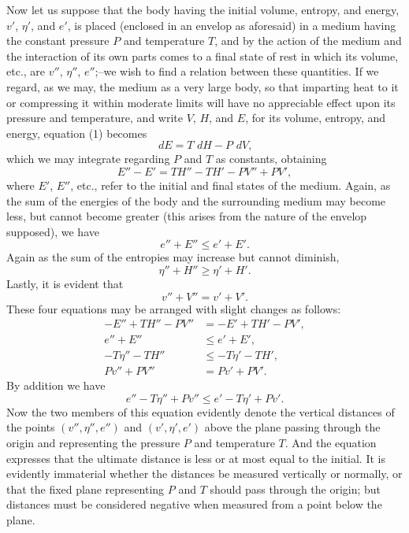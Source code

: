 \documentclass[11pt]{article}
\newcommand{\dd}{\,d}
\begin{document}
Now let us suppose that the body having the initial volume, entropy, and energy, $v'$, $\eta'$, and $e'$, is placed (enclosed in an envelop as aforesaid) in a medium having the constant pressure $P$ and temperature $T$, and by the action of the medium and the interaction of its own parts comes to a final state of rest in which its volume, etc., are $v''$, $\eta''$, $e''$;--we wish to find a relation between these quantities. If we regard, as we may, the medium as a very large body, so that imparting heat to it or compressing it within moderate limits will have no appreciable effect upon its pressure and temperature, and write $V$, $H$, and $E$, for its volume, entropy, and energy, equation (1) becomes
\[
\dd E=T\,\dd H-P\,\dd V,
\]
which we may integrate regarding $P$ and $T$ as constants, obtaining
\begin{equation}
E''-E'=TH''-TH'-PV''+PV', \tag{a}
\end{equation}
where $E'$, $E''$, etc., refer to the initial and final states of the medium. Again, as the sum of the energies of the body and the surrounding medium may become less, but cannot become greater (this arises from the nature of the envelop supposed), we have
\begin{equation}
e''+E''\le e'+E'. \tag{b}
\end{equation}
Again as the sum of the entropies may increase but cannot diminish,
\begin{equation}
\eta''+H''\ge \eta'+H'. \tag{c}
\end{equation}
Lastly, it is evident that
\begin{equation}
v''+V''=v'+V'. \tag{d}
\end{equation}
These four equations may be arranged with slight changes as follows:
\begin{align*}
-E''+TH''-PV''&=-E'+TH'-PV',\\
e''+E''&\le e'+E',\\
-T\eta''-TH''&\le -T\eta'-TH',\\
Pv''+PV''&=Pv'+PV'.
\end{align*}
By addition we have
\begin{equation}
e''-T\eta''+Pv''\le e'-T\eta'+Pv'. \tag{e}
\end{equation}
Now the two members of this equation evidently denote the vertical distances of the points $(v'',\eta'',e'')$ and $(v',\eta',e')$ above the plane passing through the origin and representing the pressure $P$ and temperature $T$. And the equation expresses that the ultimate distance is less or at most equal to the initial. It is evidently immaterial whether the distances be measured vertically or normally, or that the fixed plane representing $P$ and $T$ should pass through the origin; but distances must be considered negative when measured from a point below the plane.
\end{document}
